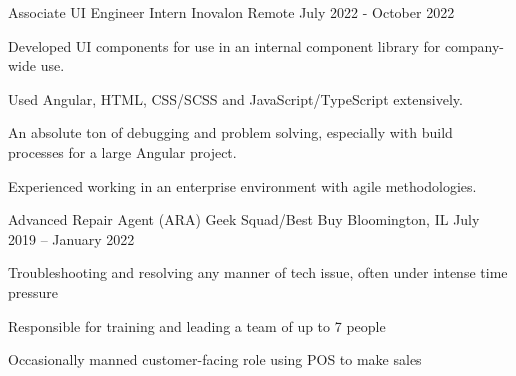 \documentclass[]{awesome-cv}
\begin{document}
\vspace{-2mm}
\begin{cventries}
   \cventry
    {Associate UI Engineer Intern}
    {Inovalon}
    {Remote}
    {July 2022 - October 2022}
    {
      \begin{cvitems}
      \item {Developed UI components for use in an internal component library for company-wide use.}
      \item {Used Angular, HTML, CSS/SCSS and JavaScript/TypeScript extensively.}
      \item {An absolute ton of debugging and problem solving, especially with build processes for a large Angular project.}
      \item {Experienced working in an enterprise environment with agile methodologies.}
      \end{cvitems}
    }
	\cventry
	{Advanced Repair Agent (ARA)}
	{Geek Squad/Best Buy}
	{Bloomington, IL}
	{July 2019 – January 2022}
	{\begin{cvitems}
      \item {Troubleshooting and resolving any manner of tech issue, often under intense time pressure}
      \item {Responsible for training and leading a team of up to 7 people}
      \item {Occasionally manned customer-facing role using POS to make sales}
		\end{cvitems}}
\end{cventries}
\end{document}

